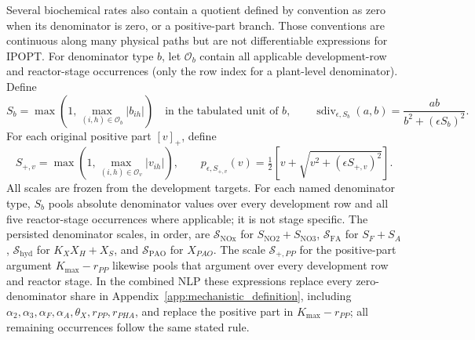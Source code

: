 \documentclass[a4paper,fleqn]{cas-sc}
\begin{document}
Several biochemical rates also contain a quotient defined by convention as zero when its denominator is zero, or a positive-part branch. Those conventions are continuous along many physical paths but are not differentiable expressions for IPOPT. For denominator type $b$, let $\mathcal O_b$ contain all applicable development-row and reactor-stage occurrences (only the row index for a plant-level denominator). Define
\begin{equation}
S_b=\max\!\left(1,\max_{(i,h)\in\mathcal O_b}|b_{ih}|\right)
\quad\text{in the tabulated unit of }b,
\qquad
\operatorname{sdiv}_{\epsilon,S_b}(a,b)
=\frac{ab}{b^2+(\epsilon S_b)^2}.
\end{equation}
For each original positive part $[v]_+$, define
\begin{equation}
S_{+,v}=\max\!\left(1,\max_{(i,h)\in\mathcal O_v}|v_{ih}|\right),
\qquad
p_{\epsilon,S_{+,v}}(v)
=\tfrac12\!\left[v+\sqrt{v^2+(\epsilon S_{+,v})^2}\right].
\end{equation}
All scales are frozen from the development targets. For each named denominator type, $S_b$ pools absolute denominator values over every development row and all five reactor-stage occurrences where applicable; it is not stage specific. The persisted denominator scales, in order, are $\mathcal S_{\mathrm{NOx}}$ for $S_{\mathrm{NO2}}+S_{\mathrm{NO3}}$, $\mathcal S_{\mathrm{FA}}$ for $S_F+S_A$, $\mathcal S_{\mathrm{hyd}}$ for $K_XX_H+X_S$, and $\mathcal S_{\mathrm{PAO}}$ for $X_{PAO}$. The scale $\mathcal S_{+,PP}$ for the positive-part argument $K_{\max}-r_{PP}$ likewise pools that argument over every development row and reactor stage. In the combined NLP these expressions replace every zero-denominator share in Appendix~\ref{app:mechanistic_definition}, including $\alpha_2,\alpha_3,\alpha_F,\alpha_A,\theta_X,r_{PP},r_{PHA}$, and replace the positive part in $K_{\max}-r_{PP}$; all remaining occurrences follow the same stated rule.
\end{document}
